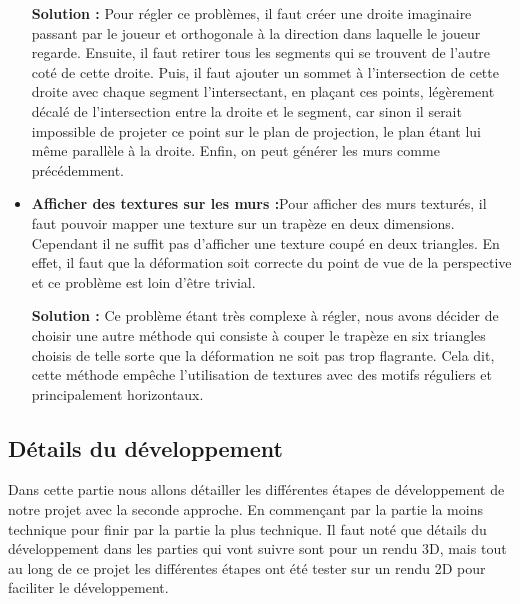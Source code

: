 \documentclass[11pt]{article}
\begin{document}
\begin{itemize}
	\textbf{Solution : }Pour régler ce problèmes, il faut créer une droite imaginaire passant par le 
	joueur et orthogonale à la direction dans laquelle le joueur regarde. Ensuite, il faut retirer
	tous les segments qui se trouvent de l'autre coté de cette droite. Puis, il faut ajouter un sommet
	à l'intersection de cette droite avec chaque segment l'intersectant, en plaçant ces points, 
	légèrement décalé de l'intersection entre la droite et le segment, car sinon il serait impossible de
	projeter ce point sur le plan de projection, le plan étant lui même parallèle à la droite. Enfin, 
	on peut générer les murs comme précédemment.

	\item \textbf{Afficher des textures sur les murs :}Pour afficher des murs texturés, il faut
	pouvoir mapper une texture sur un trapèze en deux dimensions. Cependant il ne suffit pas d'afficher 
	une texture coupé en deux triangles. En effet, il faut que la déformation soit correcte
	du point de vue de la perspective et ce problème est loin d'être trivial.

	\textbf{Solution : }Ce problème étant très complexe à régler, nous avons décider de choisir
	une autre méthode qui consiste à couper le trapèze en six triangles choisis de telle 
	sorte que la déformation ne soit pas trop flagrante. Cela dit, cette méthode empêche 
	l'utilisation de textures avec des motifs réguliers et principalement horizontaux.
\end{itemize}



\subsection{Détails du développement}
Dans cette partie nous allons détailler les différentes étapes de développement de notre 
projet avec la seconde approche. En commençant par la partie la moins technique pour 
finir par la partie la plus technique. Il faut noté que détails du développement dans les 
parties qui vont suivre sont pour un rendu 3D, mais tout au long de ce projet les 
différentes étapes ont été tester sur un rendu 2D pour faciliter le développement.
\end{document}

